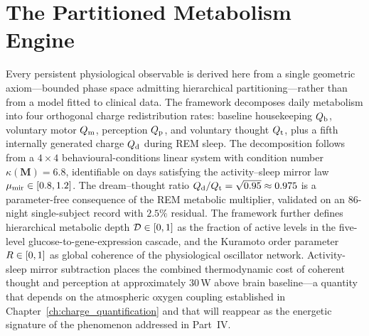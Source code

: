 \chapter{The Partitioned Metabolism Engine}
\label{ch:metabolism_engine}


\begin{chapterabstract}
Every persistent physiological observable is derived here from a single geometric axiom---bounded phase space admitting hierarchical partitioning---rather than from a model fitted to clinical data. The framework decomposes daily metabolism into four orthogonal charge redistribution rates: baseline housekeeping $\Qb$, voluntary motor $\Qm$, perception $\Qp$, and voluntary thought $\Qt$, plus a fifth internally generated charge $\Qd$ during REM sleep. The decomposition follows from a $4 \times 4$ behavioural-conditions linear system with condition number $\kappa(\mathbf{M}) = 6.8$, identifiable on days satisfying the activity--sleep mirror law $\munir \in [0.8,1.2]$. The dream--thought ratio $\Qd/\Qt = \sqrt{0.95} \approx 0.975$ is a parameter-free consequence of the REM metabolic multiplier, validated on an 86-night single-subject record with $2.5\%$ residual. The framework further defines hierarchical metabolic depth $\Dhier \in [0,1]$ as the fraction of active levels in the five-level glucose-to-gene-expression cascade, and the Kuramoto order parameter $\Rcoh \in [0,1]$ as global coherence of the physiological oscillator network. Activity-sleep mirror subtraction places the combined thermodynamic cost of coherent thought and perception at approximately $30$\,W above brain baseline---a quantity that depends on the atmospheric oxygen coupling established in Chapter~\ref{ch:charge_quantification} and that will reappear as the energetic signature of the phenomenon addressed in Part~IV.
\end{chapterabstract}

\providecommand{\Dhier}{\mathcal{D}}
\providecommand{\Rcoh}{R}
\providecommand{\Korder}{K}
\providecommand{\munir}{\mu_{\mathrm{mir}}}
\providecommand{\etadrug}{\eta_{\mathrm{drug}}}
\providecommand{\Itot}{I_{\mathrm{tot}}}
\providecommand{\Fin}{F^{\mathrm{in}}}
\providecommand{\Fout}{F^{\mathrm{out}}}
\providecommand{\Qb}{Q_{\mathrm{b}}}
\providecommand{\Qm}{Q_{\mathrm{m}}}
\providecommand{\Qp}{Q_{\mathrm{p}}}
\providecommand{\Qt}{Q_{\mathrm{t}}}
\providecommand{\Qd}{Q_{\mathrm{d}}}
\providecommand{\Pb}{P_{\mathrm{b}}}
\providecommand{\Pcog}{P_{\mathrm{cog}}}
\providecommand{\Pbrain}{P_{\mathrm{brain}}}
\providecommand{\Cbrain}{C_{\mathrm{brain}}}
\providecommand{\Cmotor}{C_{\mathrm{motor}}}
\providecommand{\Cperc}{C_{\mathrm{perc}}}
\providecommand{\fcard}{f_{\mathrm{card}}}
\providecommand{\taurest}{\tau_{\mathrm{rest}}}
\providecommand{\RMSSD}{\mathrm{RMSSD}}

